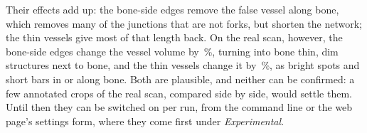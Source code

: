 Their effects add up: the bone-side edges remove the false vessel along bone, which removes many of
the junctions that are not forks, but shorten the network; the thin vessels give most of that length
back. On the real scan, however, the bone-side edges change the vessel volume by
\pbValueExpRealBoneSideVesselPct\,\%, turning into bone thin, dim structures next to bone, and the
thin vessels change it by \pbValueExpRealThinVesselPct\,\%, as bright spots and short bars in or
along bone. Both are plausible, and neither can be confirmed: a few annotated crops of the real scan,
compared side by side, would settle them. Until then they can be switched on per run, from the
command line or the web page's settings form, where they come first under \emph{Experimental}.
